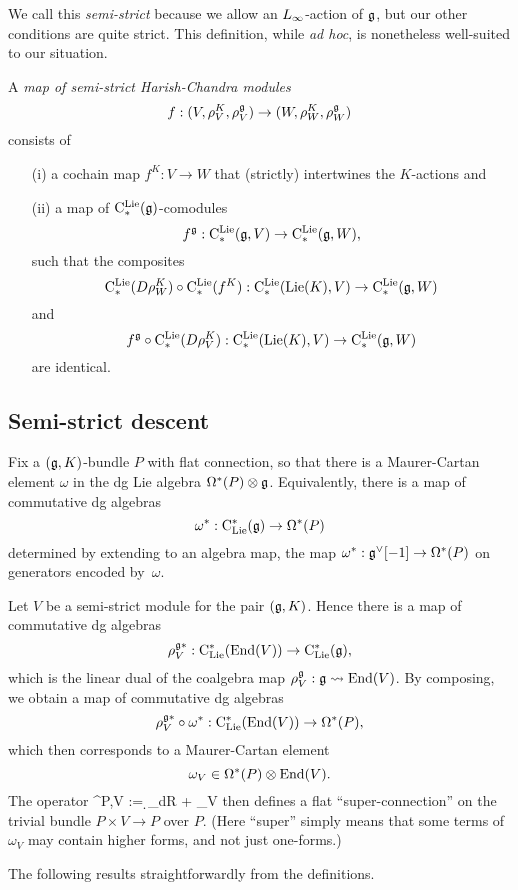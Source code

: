 We call this \emph{semi-strict} because we allow an $\L8$-action of $\mathfrak g$,
but our other conditions are quite strict.
This definition, while {\it ad hoc}, is nonetheless well-suited to our situation.

\begin{dfn}
A {\em map of semi-strict Harish-Chandra modules} 
\[
f: (V,\rho^K_V,\rho^\mathfrak g_V) \to (W,\rho^K_W,\rho^\mathfrak g_W)
\]
consists of
\begin{itemize}
\item[(i)] a cochain map $f^K: V \to W$ that (strictly) intertwines the $K$-actions and
\item[(ii)] a map of ${\rm C}^{\rm Lie}_*(\mathfrak g)$-comodules
\[
f^\mathfrak g: {\rm C}^{\rm Lie}_*(\mathfrak g,V) \to {\rm C}^{\rm Lie}_*(\mathfrak g,W),
\]
such that the composites
\[
{\rm C}^{\rm Lie}_*(D\rho^K_W) \circ {\rm C}^{\rm Lie}_*(f^K): {\rm C}^{\rm Lie}_*({\rm Lie}(K),V) \to {\rm C}^{\rm Lie}_*(\mathfrak g,W)
\]
and
\[
f^\mathfrak g \circ {\rm C}^{\rm Lie}_*(D\rho^K_V): {\rm C}^{\rm Lie}_*({\rm Lie}(K),V) \to {\rm C}^{\rm Lie}_*(\mathfrak g,W)
\]
are identical.
\end{itemize}
\end{dfn}

\subsection{Semi-strict descent}

Fix a $(\mathfrak g,K)$-bundle $P$ with flat connection, 
so that there is a Maurer-Cartan element $\omega$ in the dg Lie algebra $\Omega^*(P) \otimes \mathfrak g$. 
Equivalently, there is a map of commutative dg algebras
\[
\omega^*: {\rm C}_{\rm Lie}^*(\mathfrak g) \to \Omega^*(P)
\]
determined by extending to an algebra map, 
the map $\omega^*: \mathfrak g^\vee[-1] \to \Omega^*(P)$ on generators encoded by~$\omega$.

Let $V$ be a semi-strict module for the pair $(\mathfrak g,K)$. 
Hence there is a map of commutative dg algebras
\[
\rho^{\mathfrak g*}_V: {\rm C}_{\rm Lie}^*({\rm End}(V)) \to {\rm C}_{\rm Lie}^*(\mathfrak g),
\]
which is the linear dual of the coalgebra map $\rho^\fg_V: \fg \l8to \End(V)$. 
By composing, we obtain a map of commutative dg algebras
\[
\rho^{\mathfrak g*}_V \circ \omega^*: {\rm C}_{\rm Lie}^*({\rm End} (V)) \to \Omega^*(P),
\]
which then corresponds to a Maurer-Cartan element 
\[
\omega_V \in \Omega^*(P) \otimes {\rm End} (V).
\]
The operator
\ben
\nabla^{P,V} := \d_{dR} + \omega_V
\een
then defines a flat ``super-connection'' on the trivial bundle $P \times V \to P$ over $P$.
(Here ``super'' simply means that some terms of $\omega_V$ may contain higher forms, and not just one-forms.)

The following results straightforwardly from the definitions.

